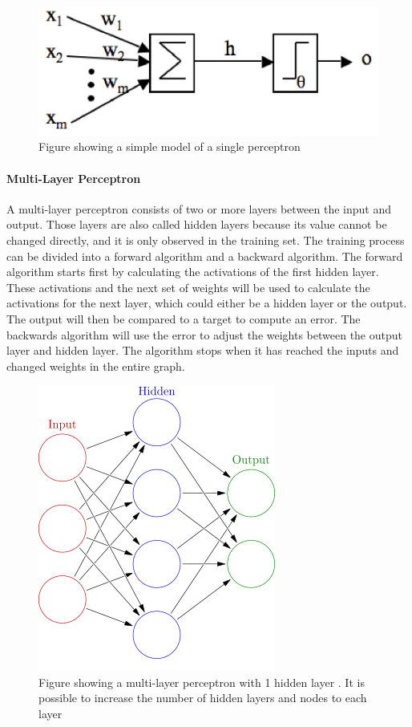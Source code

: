 \documentclass[USenglish]{ifimaster}  %
\begin{document}
	
\begin{figure}[h]
	\centering
	\includegraphics[scale=0.9]{Figures/neuron2.PNG}
	\caption{Figure showing a simple model of a single perceptron \cite{Marsland:2009:MLA:1571643}}
	\label{fig:NN}
\end{figure}
	
\paragraph{Multi-Layer Perceptron}
A multi-layer perceptron consists of two or more layers between the input and output. Those layers are also called hidden layers because its value cannot be changed directly, and it is only observed in the training set. The training process can be divided into a forward algorithm and a backward algorithm. The forward algorithm starts first by calculating the activations of the first hidden layer. These activations and the next set of weights will be used to calculate the activations for the next layer, which could either be a hidden layer or the output. The output will then be compared to a target to compute an error. The backwards algorithm will use the error to adjust the weights between the output layer and hidden layer. The algorithm stops when it has reached the inputs and changed weights in the entire graph.
	
	
\begin{figure}[h]
	\centering
	\includegraphics[scale=0.6]{Figures/MLP.png}
	\caption{Figure showing a multi-layer perceptron with 1 hidden layer \cite{MLP}. It is possible to increase the number of hidden layers and nodes to each layer}
	\label{fig:MLP}
\end{figure}
	
\end{document}
